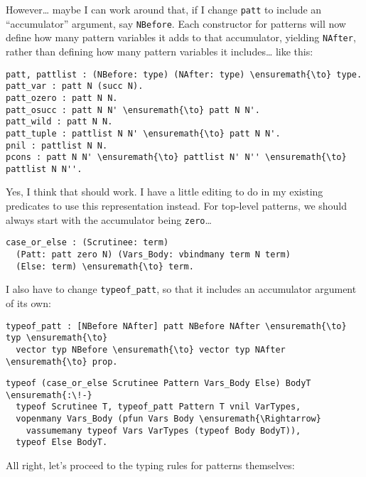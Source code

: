 However\ldots{} maybe I can work around that, if I change \texttt{patt}
to include an ``accumulator'' argument, say \texttt{NBefore}. Each
constructor for patterns will now define how many pattern variables it
adds to that accumulator, yielding \texttt{NAfter}, rather than defining
how many pattern variables it includes\ldots{} like this:

\begin{verbatim}
patt, pattlist : (NBefore: type) (NAfter: type) \ensuremath{\to} type.
patt_var : patt N (succ N).
patt_ozero : patt N N.
patt_osucc : patt N N' \ensuremath{\to} patt N N'.
patt_wild : patt N N.
patt_tuple : pattlist N N' \ensuremath{\to} patt N N'.
pnil : pattlist N N.
pcons : patt N N' \ensuremath{\to} pattlist N' N'' \ensuremath{\to} pattlist N N''.
\end{verbatim}

Yes, I think that should work. I have a little editing to do in my
existing predicates to use this representation instead. For top-level
patterns, we should always start with the accumulator being
\texttt{zero}\ldots{}

\begin{verbatim}
case_or_else : (Scrutinee: term)
  (Patt: patt zero N) (Vars_Body: vbindmany term N term)
  (Else: term) \ensuremath{\to} term.
\end{verbatim}

I also have to change \texttt{typeof\_patt}, so that it includes an
accumulator argument of its own:

\importantCodeblock{}

\begin{verbatim}
typeof_patt : [NBefore NAfter] patt NBefore NAfter \ensuremath{\to} typ \ensuremath{\to}
  vector typ NBefore \ensuremath{\to} vector typ NAfter \ensuremath{\to} prop.
\end{verbatim}

\importantCodeblock{}

\begin{verbatim}
typeof (case_or_else Scrutinee Pattern Vars_Body Else) BodyT \ensuremath{:\!-}
  typeof Scrutinee T, typeof_patt Pattern T vnil VarTypes,
  vopenmany Vars_Body (pfun Vars Body \ensuremath{\Rightarrow}
    vassumemany typeof Vars VarTypes (typeof Body BodyT)),
  typeof Else BodyT.
\end{verbatim}

\importantCodeblockEnd{}

All right, let's proceed to the typing rules for patterns themselves:

